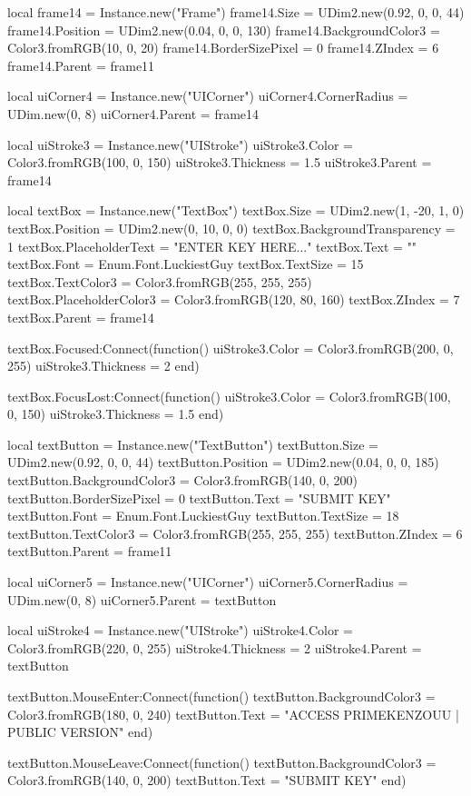   local frame14 = Instance.new("Frame")
  frame14.Size = UDim2.new(0.92, 0, 0, 44)
  frame14.Position = UDim2.new(0.04, 0, 0, 130)
  frame14.BackgroundColor3 = Color3.fromRGB(10, 0, 20)
  frame14.BorderSizePixel = 0
  frame14.ZIndex = 6
  frame14.Parent = frame11

  local uiCorner4 = Instance.new("UICorner")
  uiCorner4.CornerRadius = UDim.new(0, 8)
  uiCorner4.Parent = frame14

  local uiStroke3 = Instance.new("UIStroke")
  uiStroke3.Color = Color3.fromRGB(100, 0, 150)
  uiStroke3.Thickness = 1.5
  uiStroke3.Parent = frame14

  local textBox = Instance.new("TextBox")
  textBox.Size = UDim2.new(1, -20, 1, 0)
  textBox.Position = UDim2.new(0, 10, 0, 0)
  textBox.BackgroundTransparency = 1
  textBox.PlaceholderText = "ENTER KEY HERE..."
  textBox.Text = ""
  textBox.Font = Enum.Font.LuckiestGuy
  textBox.TextSize = 15
  textBox.TextColor3 = Color3.fromRGB(255, 255, 255)
  textBox.PlaceholderColor3 = Color3.fromRGB(120, 80, 160)
  textBox.ZIndex = 7
  textBox.Parent = frame14

  textBox.Focused:Connect(function()
    uiStroke3.Color = Color3.fromRGB(200, 0, 255)
    uiStroke3.Thickness = 2
  end)

  textBox.FocusLost:Connect(function()
    uiStroke3.Color = Color3.fromRGB(100, 0, 150)
    uiStroke3.Thickness = 1.5
  end)

  local textButton = Instance.new("TextButton")
  textButton.Size = UDim2.new(0.92, 0, 0, 44)
  textButton.Position = UDim2.new(0.04, 0, 0, 185)
  textButton.BackgroundColor3 = Color3.fromRGB(140, 0, 200)
  textButton.BorderSizePixel = 0
  textButton.Text = "SUBMIT KEY"
  textButton.Font = Enum.Font.LuckiestGuy
  textButton.TextSize = 18
  textButton.TextColor3 = Color3.fromRGB(255, 255, 255)
  textButton.ZIndex = 6
  textButton.Parent = frame11

  local uiCorner5 = Instance.new("UICorner")
  uiCorner5.CornerRadius = UDim.new(0, 8)
  uiCorner5.Parent = textButton

  local uiStroke4 = Instance.new("UIStroke")
  uiStroke4.Color = Color3.fromRGB(220, 0, 255)
  uiStroke4.Thickness = 2
  uiStroke4.Parent = textButton

  textButton.MouseEnter:Connect(function()
    textButton.BackgroundColor3 = Color3.fromRGB(180, 0, 240)
    textButton.Text = "ACCESS PRIMEKENZOUU | PUBLIC VERSION"
  end)

  textButton.MouseLeave:Connect(function()
    textButton.BackgroundColor3 = Color3.fromRGB(140, 0, 200)
    textButton.Text = "SUBMIT KEY"
  end)


